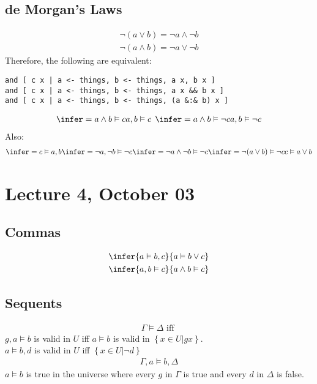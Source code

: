 \documentclass{article}
\begin{document}
\subsection{de Morgan's Laws}
\begin{align}
	\neg (a \vee b) = \neg a \wedge \neg b \\
	\neg (a \wedge b) = \neg a \vee \neg b
\end{align}
Therefore, the following are equivalent:
\begin{verbatim}
and [ c x | a <- things, b <- things, a x, b x ]
and [ c x | a <- things, b <- things, a x && b x ]
and [ c x | a <- things, b <- things, (a &:& b) x ]
\end{verbatim}
\begin{align}
	\infer={a\wedge b \vDash c}{a, b \vDash c}\:\:
	\infer={a \wedge b \vDash \neg c}{a, b \vDash \neg c}
\end{align}
Also:
\begin{align}
	\infer={c\vDash a,b}{
	\infer={\neg a, \neg b \vDash \neg c}{
			\infer={\neg a \wedge \neg b \vDash \neg c}{
					\infer={\neg (a\vee b)\vDash \neg c}{
							c\vDash a\vee b
						}
				}
		}
	}
\end{align}
\section{Lecture 4, October 03}
\subsection{Commas}
\begin{align}
	\infer{a\vDash b,c}{a \vDash b \vee c} \\
	\infer{a,b\vDash c}{a\wedge b\vDash c}
\end{align}
\subsection{Sequents}
\begin{align}
	\Gamma \vDash \Delta \text{ iff }
\end{align}
$g,a\vDash b$ is valid in $U$ iff $a\vDash b$ is valid in $\left\{x \in U | g x\right\}$.\\
$a\vDash b,d$ is valid in $U$ iff $\left\{x \in U | \neg d \right\}$\\
\begin{align}
	\Gamma, a \vDash b, \Delta
\end{align}
$a \vDash b$ is true in the universe where every $g$ in $\Gamma$ is true and every $d$ in $\Delta$ is false.
\end{document}
